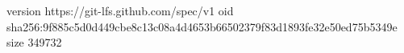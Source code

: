 version https://git-lfs.github.com/spec/v1
oid sha256:9f885c5d0d449cbe8c13c08a4d4653b66502379f83d1893fe32e50ed75b5349e
size 349732
